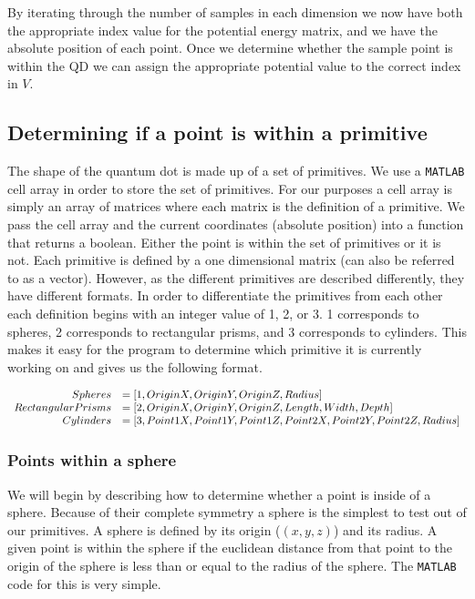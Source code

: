 \documentclass[authoryearcitations]{UoYCSproject}
\begin{document}
By iterating through the number of samples in each dimension we now have both the appropriate index value for the 
potential energy matrix, and we have the absolute position of each point. Once we determine whether the sample point
is within the QD we can assign the appropriate potential value to the correct index in $V$. 

\subsection{Determining if a point is within a primitive}
The shape of the quantum dot is made up of a set of primitives. We use a \verb+MATLAB+ cell array in order to store
the set of primitives. For our purposes a cell array is simply an array of matrices where each matrix is the
definition of a primitive. We pass the cell array and the current coordinates (absolute position) into a function
that returns a boolean. Either the point is within the set of primitives or it is not. Each primitive is defined
by a one dimensional matrix (can also be referred to as a vector). However, as the different primitives are described
differently, they have different
formats. In order to differentiate the primitives from each other each definition begins with an
integer value of 1, 2, or 3. 1 corresponds to spheres, 2 corresponds to rectangular prisms, and 3 corresponds to 
cylinders. This makes it easy for the program to determine which primitive it is currently working on and gives us the
following format. 

$$\begin{array}{r l}
        Spheres &= [1, OriginX, OriginY, OriginZ, Radius] \\
        Rectangular Prisms &= [2, OriginX, OriginY, OriginZ, Length, Width, Depth] \\
        Cylinders &= [3, Point1X, Point1Y, Point1Z, Point2X, Point2Y, Point2Z, Radius] 
  \end{array}$$

\subsubsection{Points within a sphere}
We will begin by describing how to determine whether a point is inside of a sphere. Because of their complete
symmetry a sphere is the simplest to test out of our primitives. A sphere is defined by its origin ($(x,y,z)$)
and its radius. A given point is within the sphere if the euclidean distance from that point to the origin of
the sphere is less than or equal to the radius of the sphere. The \verb+MATLAB+ code for this is very simple.
\end{document}
